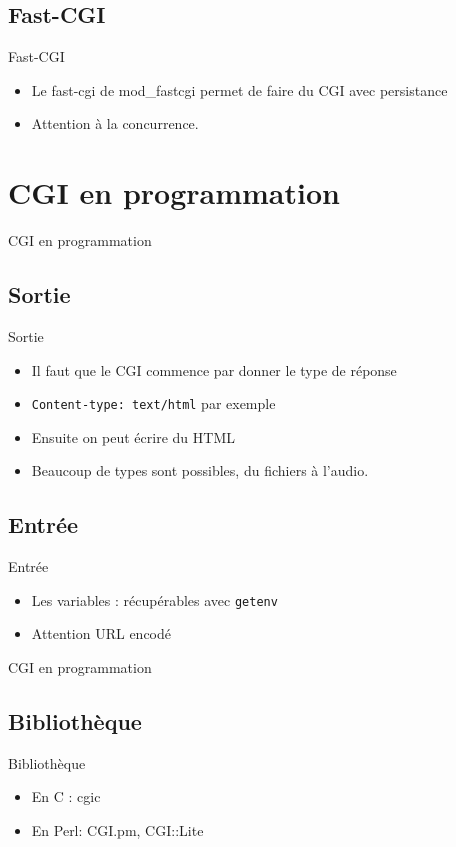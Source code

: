 \begin{frame}{\sectitle}
    \def\subsectitle{Fast-CGI}
    \subsection{\subsectitle}
    \begin{block}{\subsectitle}
        \begin{itemize}
            \item Le fast-cgi de mod\_fastcgi permet de faire du CGI avec
                persistance
            \item Attention à la concurrence.
        \end{itemize}
    \end{block}
\end{frame}

\def\sectitle{CGI en programmation}
\section{\sectitle}
\begin{frame}[containsverbatim]{\sectitle}
    \def\subsectitle{Sortie}
    \subsection{\subsectitle}
    \begin{block}{\subsectitle}
        \begin{itemize}
            \item Il faut que le CGI commence par donner le type de réponse 
            \item \verb+Content-type: text/html+ par exemple
            \item Ensuite on peut écrire du HTML
            \item Beaucoup de types sont possibles, du fichiers à l'audio.
        \end{itemize}
    \end{block}
    \def\subsectitle{Entrée}
    \subsection{\subsectitle}
    \begin{block}{\subsectitle}
        \begin{itemize}
            \item Les variables : récupérables avec \verb+getenv+
            \item Attention URL encodé
        \end{itemize}
    \end{block}
\end{frame}

\begin{frame}{\sectitle}
    \def\subsectitle{Bibliothèque}
    \subsection{\subsectitle}
    \begin{block}{\subsectitle}
        \begin{itemize}
            \item En C : cgic
            \item En Perl: CGI.pm, CGI::Lite
        \end{itemize}
    \end{block}
\end{frame}


